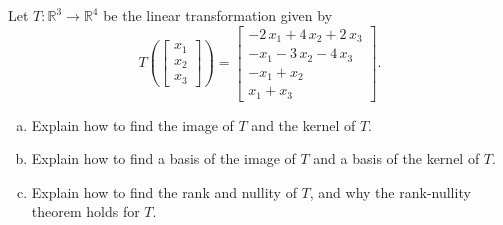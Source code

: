
\begin{exerciseStatement}
 Let \(T:\mathbb{R}^ 3  \to \mathbb{R}^ 4 \) be the linear transformation given by \[T\left(  \left[\begin{array}{c}
x_{1} \\
x_{2} \\
x_{3}
\end{array}\right]  \right) =  \left[\begin{array}{c}
-2 \, x_{1} + 4 \, x_{2} + 2 \, x_{3} \\
-x_{1} - 3 \, x_{2} - 4 \, x_{3} \\
-x_{1} + x_{2} \\
x_{1} + x_{3}
\end{array}\right] .\]
\begin{enumerate}[(a)]
\item Explain how to find the image of \(T\) and the kernel of \(T\).
\item Explain how to find a basis of the image of \(T\) and a basis of the kernel of \(T\).
\item Explain how to find the rank and nullity of \(T\), and why the rank-nullity theorem holds for \(T\).
\end{enumerate}
    
\end{exerciseStatement}
    
